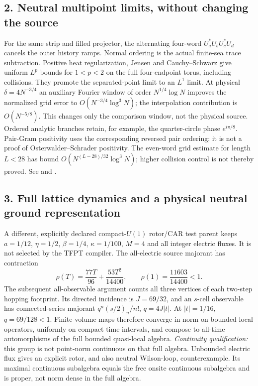 \subsection*{2. Neutral multipoint limits, without changing the source}
For the same strip and filled projector, the alternating four-word
$U_a^*U_bU_c^*U_d$ cancels the outer history ramps. Normal ordering is
the actual finite-sea trace subtraction. Positive heat regularization,
Jensen and Cauchy--Schwarz give uniform $L^p$ bounds for $1<p<2$ on the
full four-endpoint torus, including collisions. They promote the
separated-point limit to an $L^1$ limit.
At physical $\delta=4N^{-3/4}$ an auxiliary Fourier window of order
$N^{1/4}\log N$ improves the normalized grid error to
$O(N^{-3/4}\log^3N)$; the interpolation contribution is
$O(N^{-5/8})$. This changes only the comparison window, not the physical
source. Ordered analytic branches retain, for example, the quarter-circle
phase $e^{i\pi/8}$. Pair-Gram positivity uses the corresponding reversed
pair ordering; it is not a proof of Osterwalder--Schrader positivity.
The even-word grid estimate for length $L<28$ has bound
$O(N^{(L-28)/32}\log^3N)$; higher collision control is not thereby proved.
See  and .

\subsection*{3. Full lattice dynamics and a physical neutral ground representation}
A different, explicitly declared compact-$U(1)$ rotor/CAR test parent
keeps $a=1/12$, $\eta=1/2$, $\beta=1/4$, $\kappa=1/100$, $M=4$ and
all integer electric fluxes. It is not selected by the TFPT compiler.
The all-electric source majorant has contraction
\[
 \rho(T)=\frac{77T}{96}+\frac{53T^2}{14400},\qquad
 \rho(1)=\frac{11603}{14400}<1.
\]
The subsequent all-observable argument counts all three vertices of
each two-step hopping footprint. Its directed incidence is $J=69/32$,
and an $s$-cell observable has connected-series majorant
$q^n(s/2)_n/n!$, $q=4J|t|$. At $|t|=1/16$, $q=69/128<1$.
Finite-volume maps therefore converge in norm on bounded local operators,
uniformly on compact time intervals, and compose to all-time
automorphisms of the full bounded quasi-local algebra.
\emph{Continuity qualification:} this group is not point-norm continuous
on that full algebra. Unbounded electric flux gives an explicit rotor,
and also neutral Wilson-loop, counterexample. Its maximal continuous
subalgebra equals the free onsite continuous subalgebra and is proper,
not norm dense in the full algebra.

